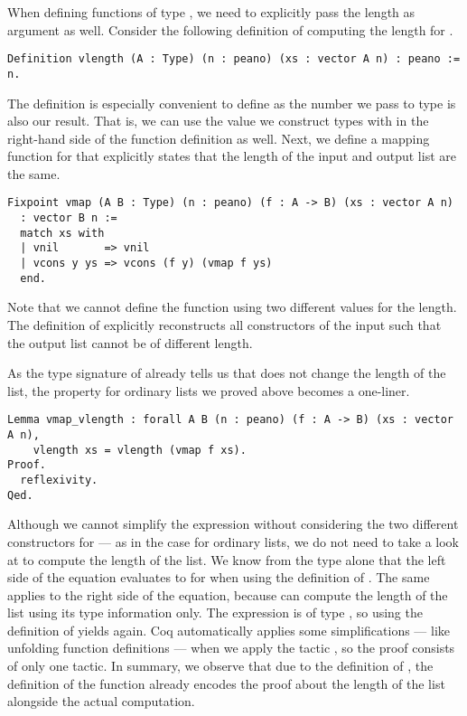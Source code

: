 When defining functions of type , we need to explicitly pass the length as argument as well.
Consider the following definition of computing the length for .

\begin{verbatim}
Definition vlength (A : Type) (n : peano) (xs : vector A n) : peano := n.
\end{verbatim}

The definition is especially convenient to define as the  number  we pass to type  is also our result.
That is, we can use the value we construct types with in the right-hand side of the function definition as well.
Next, we define a mapping function for  that explicitly states that the length of the input and output list are the same.

\begin{verbatim}
Fixpoint vmap (A B : Type) (n : peano) (f : A -> B) (xs : vector A n)
  : vector B n :=
  match xs with
  | vnil       => vnil
  | vcons y ys => vcons (f y) (vmap f ys)
  end.
\end{verbatim}

Note that we cannot define the function using two different values for the length.
The definition of  explicitly reconstructs all constructors of the input  such that the output list cannot be of different length.

As the type signature of  already tells us that  does not change the length of the list, the property for ordinary lists we proved above becomes a one-liner.

\begin{verbatim}
Lemma vmap_vlength : forall A B (n : peano) (f : A -> B) (xs : vector A n),
    vlength xs = vlength (vmap f xs).
Proof.
  reflexivity.
Qed.
\end{verbatim}

Although we cannot simplify the expression  without considering the two different constructors for  --- as in the case for ordinary lists, we do not need to take a look at  to compute the length of the list.
We know from the type alone that the left side of the equation evaluates to  for  when using the definition of .
The same applies to the right side of the equation, because  can compute the length of the list using its type information only.
The expression  is of type , so using the definition of  yields  again.
Coq automatically applies some simplifications --- like unfolding function definitions --- when we apply the tactic , so the proof consists of only one tactic.
In summary, we observe that due to the definition of , the definition of the function  already encodes the proof about the length of the list alongside the actual computation.


